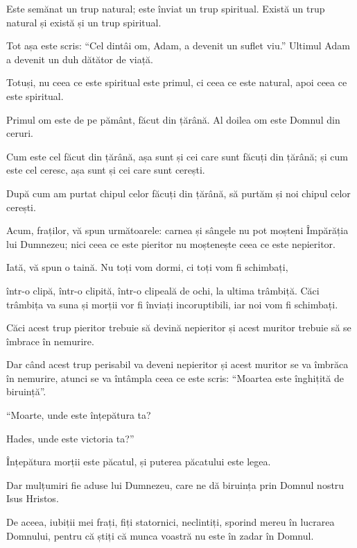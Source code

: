 {Este semănat un trup natural; este înviat un trup spiritual. Există un trup natural și există și un trup spiritual.


\par }{\PP {}Tot așa este scris: “Cel dintâi om, Adam, a devenit un suflet viu.” Ultimul Adam a devenit un duh dătător de viață.

Totuși, nu ceea ce este spiritual este primul, ci ceea ce este natural, apoi ceea ce este spiritual.

Primul om este de pe pământ, făcut din țărână. Al doilea om este Domnul din ceruri.

Cum este cel făcut din țărână, așa sunt și cei care sunt făcuți din țărână; și cum este cel ceresc, așa sunt și cei care sunt cerești.

După cum am purtat chipul celor făcuți din țărână, să purtăm și noi chipul celor cerești.

Acum, fraților, vă spun următoarele: carnea și sângele nu pot moșteni Împărăția lui Dumnezeu; nici ceea ce este pieritor nu moștenește ceea ce este nepieritor.


\par }{\PP {}Iată, vă spun o taină. Nu toți vom dormi, ci toți vom fi schimbați,

într-o clipă, într-o clipită, într-o clipeală de ochi, la ultima trâmbiță. Căci trâmbița va suna și morții vor fi înviați incoruptibili, iar noi vom fi schimbați.

Căci acest trup pieritor trebuie să devină nepieritor și acest muritor trebuie să se îmbrace în nemurire.

Dar când acest trup perisabil va deveni nepieritor și acest muritor se va îmbrăca în nemurire, atunci se va întâmpla ceea ce este scris: “Moartea este înghițită de biruință”.


\par }{\Q {}“Moarte, unde este înțepătura ta?

\par }{\QB Hades, unde este victoria ta?”


\par }{\PP {}Înțepătura morții este păcatul, și puterea păcatului este legea.

Dar mulțumiri fie aduse lui Dumnezeu, care ne dă biruința prin Domnul nostru Isus Hristos.

De aceea, iubiții mei frați, fiți statornici, neclintiți, sporind mereu în lucrarea Domnului, pentru că știți că munca voastră nu este în zadar în Domnul.



}
